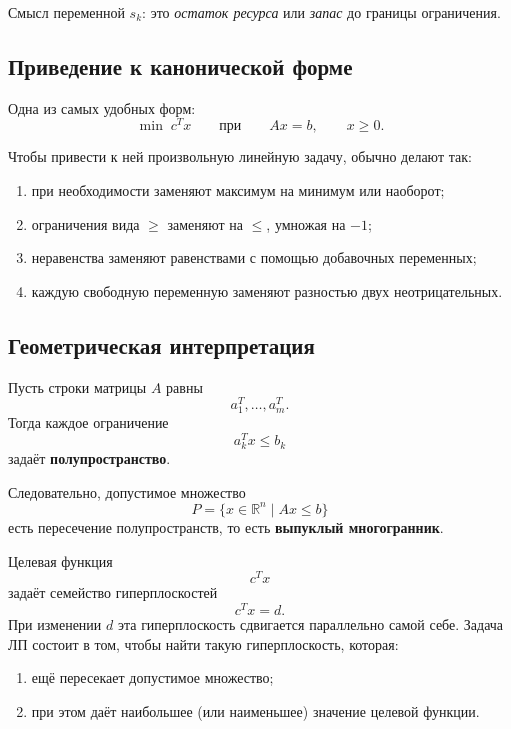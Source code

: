 	Смысл переменной \(s_k\): это \emph{остаток ресурса} или \emph{запас} до границы ограничения.
	
	\subsection{Приведение к канонической форме}
	
	Одна из самых удобных форм:
	\[
	\min \; c^T x
	\qquad \text{при} \qquad
	Ax = b, \qquad x \ge 0.
	\]
	
	Чтобы привести к ней произвольную линейную задачу, обычно делают так:
	
	\begin{enumerate}
		\item при необходимости заменяют максимум на минимум или наоборот;
		\item ограничения вида \(\ge\) заменяют на \(\le\), умножая на \(-1\);
		\item неравенства заменяют равенствами с помощью добавочных переменных;
		\item каждую свободную переменную заменяют разностью двух неотрицательных.
	\end{enumerate}
	
	\subsection{Геометрическая интерпретация}
	
	Пусть строки матрицы \(A\) равны
	\[
	a_1^T,\dots,a_m^T.
	\]
	Тогда каждое ограничение
	\[
	a_k^T x \le b_k
	\]
	задаёт \textbf{полупространство}.
	
	Следовательно, допустимое множество
	\[
	P=\{x \in \mathbb{R}^n \mid Ax \le b\}
	\]
	есть пересечение полупространств, то есть \textbf{выпуклый многогранник}.
	
	Целевая функция
	\[
	c^T x
	\]
	задаёт семейство гиперплоскостей
	\[
	c^T x = d.
	\]
	При изменении \(d\) эта гиперплоскость сдвигается параллельно самой себе. Задача ЛП состоит в том, чтобы найти такую гиперплоскость, которая:
	\begin{enumerate}
		\item ещё пересекает допустимое множество;
		\item при этом даёт наибольшее (или наименьшее) значение целевой функции.
	\end{enumerate}
	
